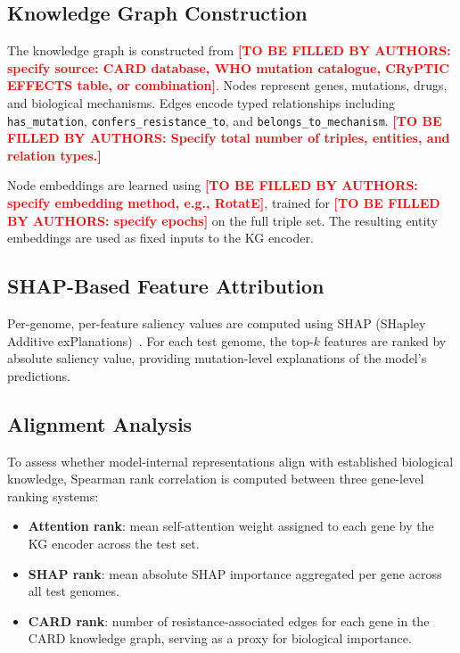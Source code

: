 \documentclass[conference]{IEEEtran}
\newcommand{\tbd}[1]{\textcolor{red}{\textbf{[TO BE FILLED BY AUTHORS: #1]}}}
\begin{document}
\subsection{Knowledge Graph Construction}

The knowledge graph is constructed from \tbd{specify source: CARD database, WHO mutation catalogue, CRyPTIC EFFECTS table, or combination}. Nodes represent genes, mutations, drugs, and biological mechanisms. Edges encode typed relationships including \texttt{has\_mutation}, \texttt{confers\_resistance\_to}, and \texttt{belongs\_to\_mechanism}. \tbd{Specify total number of triples, entities, and relation types.}

Node embeddings are learned using \tbd{specify embedding method, e.g., RotatE}, trained for \tbd{specify epochs} on the full triple set. The resulting entity embeddings are used as fixed inputs to the KG encoder.

\subsection{SHAP-Based Feature Attribution}

Per-genome, per-feature saliency values are computed using SHAP (SHapley Additive exPlanations)~\cite{ref_shap}. For each test genome, the top-$k$ features are ranked by absolute saliency value, providing mutation-level explanations of the model's predictions.

\subsection{Alignment Analysis}

To assess whether model-internal representations align with established biological knowledge, Spearman rank correlation is computed between three gene-level ranking systems:

\begin{itemize}
    \item \textbf{Attention rank}: mean self-attention weight assigned to each gene by the KG encoder across the test set.
    \item \textbf{SHAP rank}: mean absolute SHAP importance aggregated per gene across all test genomes.
    \item \textbf{CARD rank}: number of resistance-associated edges for each gene in the CARD knowledge graph, serving as a proxy for biological importance.
\end{itemize}
\end{document}

